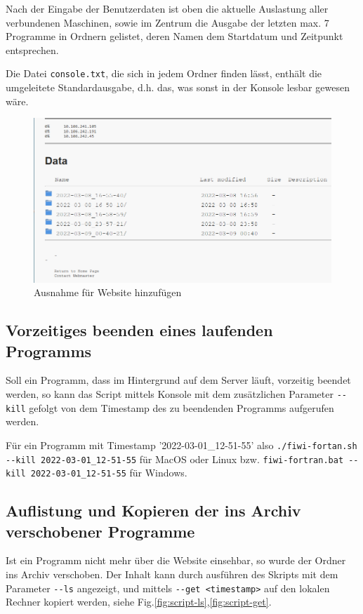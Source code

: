 \documentclass[11pt, a4paper]{article}
\begin{document}
Nach der Eingabe der Benutzerdaten ist oben die aktuelle Auslastung aller verbundenen Maschinen, sowie im Zentrum die Ausgabe der letzten max. 7 Programme in Ordnern gelistet, deren Namen dem Startdatum und Zeitpunkt entsprechen.

Die Datei \texttt{console.txt}, die sich in jedem Ordner finden lässt, enthält die umgeleitete Standardausgabe, d.h. das, was sonst in der Konsole lesbar gewesen wäre.

\begin{figure}[h]
    \centering
    \includegraphics[width=0.7\linewidth]{./pics/2022-03-09_01-18.png}
    \caption{Ausnahme für Website hinzufügen}
    \label{fig:web-1}
\end{figure}


\subsection{Vorzeitiges beenden eines laufenden Programms}

Soll ein Programm, dass im Hintergrund auf dem Server läuft, vorzeitig beendet werden, so kann das Script mittels Konsole mit dem zusätzlichen Parameter \texttt{-{}-kill} gefolgt von dem Timestamp des zu beendenden Programms aufgerufen werden.

Für ein Programm mit Timestamp '2022-03-01\_12-51-55' also
\newline\texttt{./fiwi-fortan.sh -{}-kill 2022-03-01\_12-51-55} für MacOS oder Linux bzw.
\newline\texttt{fiwi-fortran.bat -{}-kill 2022-03-01\_12-51-55} für Windows.

\subsection{Auflistung und Kopieren der ins Archiv verschobener Programme}
Ist ein Programm nicht mehr über die Website einsehbar, so wurde der Ordner ins Archiv verschoben.
Der Inhalt kann durch ausführen des Skripts mit dem Parameter \newline\texttt{-{}-ls} angezeigt, und mittels \newline\texttt{-{}-get <timestamp>} auf den lokalen Rechner kopiert werden, siehe Fig.\ref{fig:script-ls},\ref{fig:script-get}.
\end{document}
